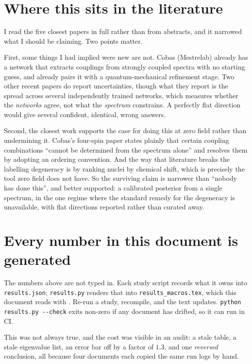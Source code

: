 \documentclass[11pt,a4paper]{article}
\begin{document}
\section{Where this sits in the literature}

I read the five closest papers in full rather than from abstracts, and it
narrowed what I should be claiming. Two points matter.

First, some things I had implied were new are not. Cobas (Mestrelab) already
has a network that extracts couplings from strongly coupled spectra with no
starting guess, and already pairs it with a quantum-mechanical refinement
stage. Two other recent papers do report uncertainties, though what they
report is the spread across several independently trained networks, which
measures whether the \emph{networks} agree, not what the \emph{spectrum}
constrains. A perfectly flat direction would give several confident, identical,
wrong answers.

Second, the closest work supports the case for doing this at zero field rather
than undermining it. Cobas's four-spin paper states plainly that certain
coupling combinations ``cannot be determined from the spectrum alone'' and
resolves them by adopting an ordering convention. And the way that literature
breaks the labelling degeneracy is by ranking nuclei by chemical shift, which
is precisely the tool zero field does not have. So the surviving claim is
narrower than ``nobody has done this'', and better supported: a calibrated
posterior from a single spectrum, in the one regime where the standard remedy
for the degeneracy is unavailable, with flat directions reported rather than
curated away.

\section{Every number in this document is generated}

The numbers above are not typed in. Each study script records what it owns into
\texttt{results.json}; \texttt{results.py} renders that into
\texttt{results\_macros.tex}, which this document reads with \verb||. Re-run
a study, recompile, and the text updates. \verb|python results.py --check| exits
non-zero if any document has drifted, so it can run in CI.

This was not always true, and the cost was visible in an audit: a stale table, a
stale eigenvalue list, an error bar off by a factor of $1.3$, and one
\emph{reversed} conclusion, all because four documents each copied the same
run logs by hand.
\end{document}
